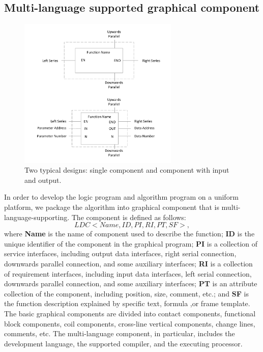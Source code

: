 \documentclass[journal,UTF8]{IEEEtran}
\begin{document}
	\subsection{Multi-language supported graphical component}
	\label{component}
	\begin{figure}
		\centering
		\includegraphics[width=3in]{fig/FIG6.pdf}
		\caption{ Two typical designs: single component and component with input and output.}
		\label{fig:Component}
	\end{figure}
	In order to develop the logic program and algorithm program on a uniform platform, we package the algorithm into graphical component that is multi-language-supporting. The component is defined as follows:
	\begin{equation}
	LDC<Name,ID,PI,RI,PT,SF>,
	\end{equation} 
	where \textbf{Name} is the name of component used to describe the function;  \textbf{ID} is the unique identifier of the component in the graphical program; \textbf{PI} is a collection of service interfaces, including output data interfaces, right serial connection, downwards parallel connection, and some auxiliary interfaces; \textbf{RI} is a collection of requirement interfaces, including input data interfaces, left serial connection, downwards parallel connection, and some auxiliary interfaces;  \textbf{PT} is an attribute collection of the component, including position, size, comment, etc.; and \textbf{SF} is the function description explained by specific text, formula ,or frame template. The basic graphical components are divided into contact components, functional block components, coil components, cross-line vertical components, change lines, comments, etc. The multi-language component, in particular, includes the development language, the supported compiler, and the executing processor.
	
\end{document}
